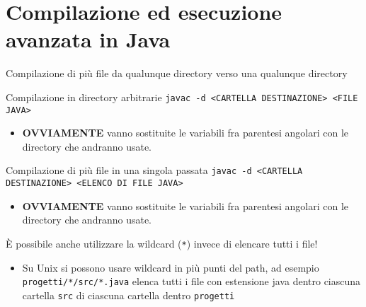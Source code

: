 \documentclass[presentation]{beamer}
\begin{document}
\section{Compilazione ed esecuzione avanzata in Java}


\begin{frame}{Compilazione di più file da qualunque directory verso una qualunque directory}
  \begin{block}{Compilazione in directory arbitrarie}
    \texttt{javac -d <CARTELLA DESTINAZIONE> <FILE JAVA>}
    \begin{itemize}
      \item \textbf{OVVIAMENTE} vanno sostituite le variabili fra parentesi angolari con le 
directory che andranno usate.
    \end{itemize}
  \end{block}
  \begin{block}{Compilazione di più file in una singola passata}
    \texttt{javac -d <CARTELLA DESTINAZIONE> <ELENCO DI FILE JAVA>}
    \begin{itemize}
      \item \textbf{OVVIAMENTE} vanno sostituite le variabili fra parentesi angolari con le 
directory che andranno usate.
    \end{itemize}
  \end{block}
  È possibile anche utilizzare la wildcard (\texttt{*}) invece di elencare tutti i file!
  \begin{itemize}
    \item Su Unix si possono usare wildcard in più punti del path, ad esempio 
\texttt{progetti/*/src/*.java} elenca tutti i file con estensione java dentro ciascuna cartella 
\texttt{src} di ciascuna cartella dentro \texttt{progetti}
  \end{itemize}
\end{frame}
\end{document}
